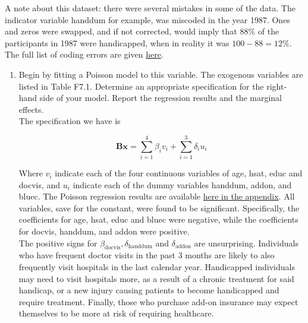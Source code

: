 \documentclass{article}
\begin{document}
A note about this dataset: there were several mistakes in some of the data. The indicator variable handdum for example, was miscoded in the year 1987. Ones and zeros were swapped, and if not corrected, would imply that $88\%$ of the participants in 1987 were handicapped, when in reality it was $100 - 88 = 12\%$. The full list of coding errors are given \hyperlink{http://qed.econ.queensu.ca/jae/2003-v18.4/riphahn-wambach-million/readme.rwm.txt}{here}.\cite{riphahn2003incentive}


\begin{enumerate}[label=(\alph*)]
\item Begin by fitting a Poisson model to this variable. The exogenous variables are listed in Table F7.1. Determine an appropriate specification for the right-hand side of your model. Report the regression results and the marginal effects.\\

The specification we have is 

	$$ \textbf{Bx}= \sum_{i=1}^4\beta_i v_i + \sum_{i=1}^3 \delta_i u_i$$

Where $v_i$ indicate each of the four continuous variables of age, hsat, educ and docvis, and $u_i$ indicate each of the dummy variables handdum, addon, and bluec. The Poisson regression results are available \hyperlink{poisson}{here in the appendix}. All variables, save for the constant, were found to be significant. Specifically, the coefficients for age, hsat, educ and bluec were negative, while the coefficients for docvis, handdum, and addon were positive.\\

The positive signs for $\beta_{\text{docvis}}, \delta_{\text{handdum}}$ and $\delta_{\text{addon}}$ are unsurprising. Individuals who have frequent doctor visits in the past 3 months are likely to also frequently visit hospitals in the last calendar year. Handicapped individuals may need to visit hospitals more, as a result of a chronic treatment for said handicap, or a new injury causing patients to become handicapped and require treatment. Finally, those who purchase add-on insurance may expect themselves to be more at risk of requiring healthcare. \\


\end{enumerate}
\end{document}
